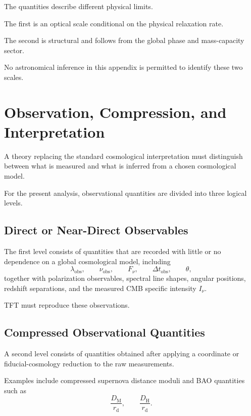 The quantities describe different physical limits.

The first is an optical scale conditional on the physical relaxation rate.

The second is structural and follows from the global phase and mass-capacity
sector.

No astronomical inference in this appendix is permitted to identify these two
scales.


\section{Observation, Compression, and Interpretation}

A theory replacing the standard cosmological interpretation must distinguish
between what is measured and what is inferred from a chosen cosmological
model.

For the present analysis, observational quantities are divided into three
logical levels.

\subsection{Direct or Near-Direct Observables}

The first level consists of quantities that are recorded with little or no
dependence on a global cosmological model, including
\begin{equation}
    \lambda_{\mathrm{obs}},
    \qquad
    \nu_{\mathrm{obs}},
    \qquad
    F_\nu,
    \qquad
    \Delta t_{\mathrm{obs}},
    \qquad
    \theta,
\end{equation}
together with polarization observables, spectral line shapes, angular
positions, redshift separations, and the measured CMB specific intensity
\(I_\nu\).

TFT must reproduce these observations.

\subsection{Compressed Observational Quantities}

A second level consists of quantities obtained after applying a coordinate or
fiducial-cosmology reduction to the raw measurements.

Examples include compressed supernova distance moduli and BAO quantities such
as
\begin{equation}
    \frac{D_{\mathrm M}}{r_{\mathrm d}},
    \qquad
    \frac{D_{\mathrm H}}{r_{\mathrm d}}.
\end{equation}

